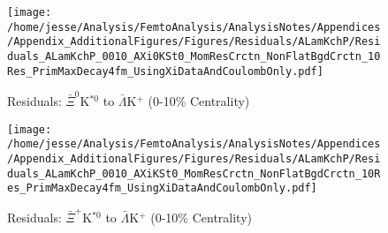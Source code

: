 \documentclass[/home/jesse/Analysis/FemtoAnalysis/AnalysisNotes/AnalysisNoteJBuxton.tex]{subfiles}
\begin{document}
\begin{figure}[h]
  \centering
  \texttt{[image: /home/jesse/Analysis/FemtoAnalysis/AnalysisNotes/Appendices/Appendix\_AdditionalFigures/Figures/Residuals/ALamKchP/Residuals\_ALamKchP\_0010\_AXi0KSt0\_MomResCrctn\_NonFlatBgdCrctn\_10Res\_PrimMaxDecay4fm\_UsingXiDataAndCoulombOnly.pdf]}
  \caption[Residuals: $\bar{\Xi}^{0}$K$^{*0}$ to $\bar{\Lambda}$K$^{+}$ (0-10\% Centrality)]{Residuals: $\bar{\Xi}^{0}$K$^{*0}$ to $\bar{\Lambda}$K$^{+}$ (0-10\% Centrality)}
  \label{fig:Res_ALamKchP_0010_AXi0KSt0}
\end{figure}

\begin{figure}[h]
  \centering
  \texttt{[image: /home/jesse/Analysis/FemtoAnalysis/AnalysisNotes/Appendices/Appendix\_AdditionalFigures/Figures/Residuals/ALamKchP/Residuals\_ALamKchP\_0010\_AXiKSt0\_MomResCrctn\_NonFlatBgdCrctn\_10Res\_PrimMaxDecay4fm\_UsingXiDataAndCoulombOnly.pdf]}
  \caption[Residuals: $\bar{\Xi}^{+}$K$^{*0}$ to $\bar{\Lambda}$K$^{+}$ (0-10\% Centrality)]{Residuals: $\bar{\Xi}^{+}$K$^{*0}$ to $\bar{\Lambda}$K$^{+}$ (0-10\% Centrality)}
  \label{fig:Res_ALamKchP_0010_AXiCKSt0}
\end{figure}
\end{document}
